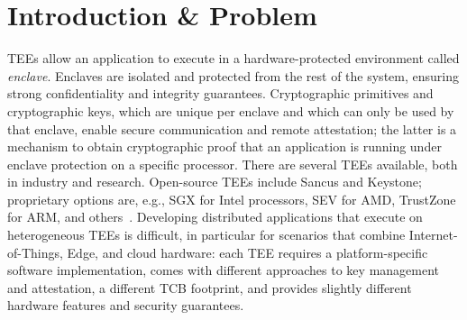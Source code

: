 \documentclass[sigconf]{acmart}
\begin{document}
\maketitle
\renewcommand{\shortauthors}{Scopelliti and Pouyanrad et al.}
%


\section{Introduction \& Problem}

\acp{TEE} allow an application to execute in a hardware-protected
environment called \emph{enclave}. Enclaves are isolated and protected from
the rest of the system, ensuring strong confidentiality and integrity
guarantees. Cryptographic primitives and cryptographic keys, which are unique per enclave
and which can only be used by that enclave, enable secure communication
and remote attestation; the latter is a mechanism to obtain cryptographic
proof that an application is running under enclave protection on a specific
processor.
%
There are several \acp{TEE} available, both in industry and research.
Open-source \acp{TEE} include Sancus and Keystone; proprietary options are,
e.g., SGX for Intel processors, SEV for AMD, TrustZone for ARM, and
others~\cite{maene:hardware}. Developing distributed applications that
execute on heterogeneous \acp{TEE} is difficult, in particular for
scenarios that combine Internet-of-Things, Edge, and cloud hardware: each
\ac{TEE} requires a platform-specific software implementation, comes with
different approaches to key management and attestation, a different
\ac{TCB} footprint, and provides slightly different hardware features and
security guarantees.
 
\end{document}
